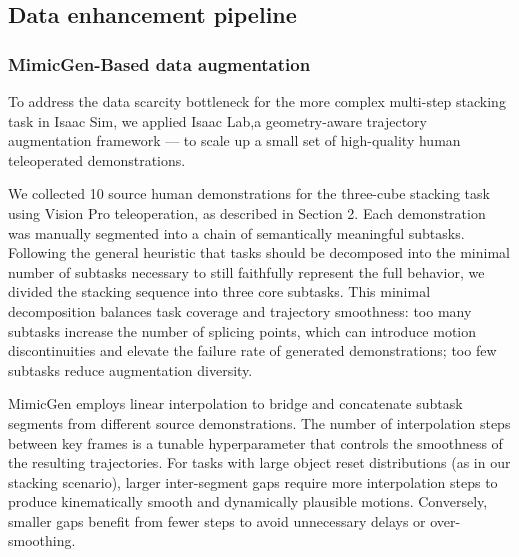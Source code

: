 \documentclass{article} %
\begin{document}




\subsection{Data enhancement pipeline}
\subsubsection{MimicGen-Based data augmentation}  
To address the data scarcity bottleneck for the more complex multi-step stacking task in Isaac Sim, we applied Isaac Lab,a geometry-aware trajectory augmentation framework — to scale up a small set of high-quality human teleoperated demonstrations.

We collected 10 source human demonstrations for the three-cube stacking task using Vision Pro teleoperation, as described in Section 2. Each demonstration was manually segmented into a chain of semantically meaningful subtasks. Following the general heuristic that tasks should be decomposed into the minimal number of subtasks necessary to still faithfully represent the full behavior, we divided the stacking sequence into three core subtasks.
This minimal decomposition balances task coverage and trajectory smoothness: too many subtasks increase the number of splicing points, which can introduce motion discontinuities and elevate the failure rate of generated demonstrations; too few subtasks reduce augmentation diversity.

MimicGen employs linear interpolation to bridge and concatenate subtask segments from different source demonstrations. The number of interpolation steps between key frames is a tunable hyperparameter that controls the smoothness of the resulting trajectories. For tasks with large object reset distributions (as in our stacking scenario), larger inter-segment gaps require more interpolation steps to produce kinematically smooth and dynamically plausible motions. Conversely, smaller gaps benefit from fewer steps to avoid unnecessary delays or over-smoothing.
\end{document}

